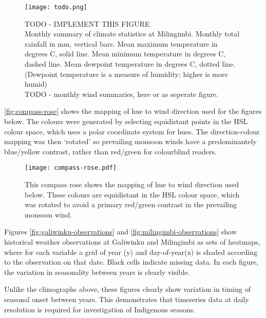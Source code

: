 \begin{figure}[h]
    \centering
    \texttt{[image: todo.png]}
    \caption[Monthly Climograph for Milingimbi]{
        TODO - IMPLEMENT THIS FIGURE\\
        Monthly summary of climate statistics at Milingimbi.
        Monthly total rainfall in mm, vertical bars.
        Mean maximum temperature in degrees C, solid line.
        Mean minimum temperature in degrees C, dashed line.
        Mean dewpoint temperature in degrees C, dotted line.
        (Dewpoint temperature is a measure of humidity; higher is more humid)
        ~\\
        TODO - monthly wind summaries, here or as seperate figure.
        }
    \label{fig:milingimbi-climograph}
\end{figure}



\autoref{fig:compass-rose} shows the mapping of hue to wind direction used
for the figures below.  The colours were generated by selecting equidistant
points in the HSL colour space, which uses a polar coordinate system for
hues.  The direction-colour mapping was then `rotated' so prevailing monsoon
winds have a predominantely blue/yellow contrast, rather than red/green
for colourblind readers.

\begin{wrapfigure}{R}{0.5\textwidth}
    \texttt{[image: compass-rose.pdf]}
    \caption[Compass Rose mapping colour to wind direction]{
        This compass rose shows the mapping of hue to wind direction used below.
        These colours are equidistant in the HSL colour space, which was rotated
        to avoid a primary red/green contrast in the prevailing monsoon wind.
        }
    \label{fig:compass-rose}
\end{wrapfigure}



Figures \ref{fig:galiwinku-observations} and \ref{fig:milingimbi-observations}
show historical weather observations at Galiwinku and Milingimbi as
sets of heatmaps, where for each variable a grid of year (y) and day-of-year(x)
is shaded according to the observation on that date.
Black cells indicate missing data.
In each figure, the variation in seasonality between years is clearly visible.

Unlike the climographs above, these figures clearly show variation in timing
of seasonal onset between years.  This demonstrates that timeseries data
at daily resolution is required for investigation of Indigenous seasons.


